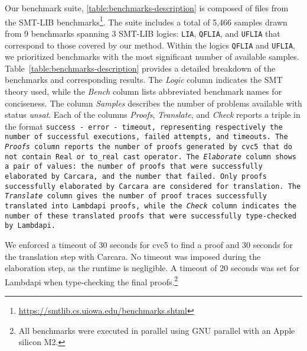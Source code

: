 Our benchmark suite, \cref{table:benchmarks-description} is composed of files from the SMT-LIB benchmarks\footnote{\url{https://smtlib.cs.uiowa.edu/benchmarks.shtml}}.
The suite includes a total of 5,466 samples drawn from 9 benchmarks spanning 3 SMT-LIB logics: \texttt{LIA}, \texttt{QFLIA}, and \texttt{UFLIA} that correspond to those covered by our method.
Within the logics \texttt{QFLIA} and \texttt{UFLIA}, we prioritized benchmarks with the most significant number of available samples.
Table~\ref{table:benchmarks-description} provides a detailed breakdown of the benchmarks and corresponding results.
The \emph{Logic} column indicates the SMT theory used, while the \emph{Bench} column lists abbreviated benchmark names for conciseness.
The column \emph{Samples} describes the number of problems available with status \emph{unsat}. 
Each of the columns \emph{Proofs}, \emph{Translate}, and \emph{Check} reports a triple in the format \tt{success - error - timeout}, representing respectively the number of successful executions, failed attempts, and timeouts. 
The \emph{Proofs} column reports the number of proofs generated by cvc5 that do not contain \lstinline[language=SMT,basicstyle=\ttfamily\footnotesize]|Real| or \lstinline[language=SMT,basicstyle=\ttfamily\footnotesize]|to_real| cast operator.
The \emph{Elaborate} column shows a pair of values: the number of proofs that were successfully elaborated by Carcara, and the number that failed. Only proofs successfully elaborated by Carcara are considered for translation.
The \emph{Translate} column gives the number of proof traces successfully translated into Lambdapi proofs, while the \emph{Check} column indicates the number of these translated proofs that were successfully type-checked by Lambdapi. 

We enforced a timeout of 30 seconds for cvc5 to find a proof and 30 seconds for the translation step with Carcara.
No timeout was imposed during the elaboration step, as the runtime is negligible.
A timeout of 20 seconds was set for Lambdapi when type-checking the final proofs.\footnote{All benchmarks were executed in parallel using GNU parallel \cite{tange_2025_15071920} with an Apple silicon M2.} %

